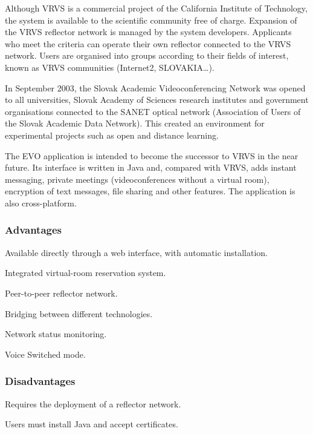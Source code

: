 Although VRVS is a commercial project of the California Institute of Technology, the system is available to the scientific community free of charge. Expansion of the VRVS reflector network is managed by the system developers. Applicants who meet the criteria can operate their own reflector connected to the VRVS network. Users are organised into groups according to their fields of interest, known as VRVS communities (Internet2, SLOVAKIA\ldots).

In September 2003, the Slovak Academic Videoconferencing Network was opened to all universities, Slovak Academy of Sciences research institutes and government organisations connected to the SANET optical network (Association of Users of the Slovak Academic Data Network). This created an environment for experimental projects such as open and distance learning.

The EVO application is intended to become the successor to VRVS in the near future. Its interface is written in Java and, compared with VRVS, adds instant messaging, private meetings (videoconferences without a virtual room), encryption of text messages, file sharing and other features. The application is also cross-platform.

\begin{samepage}
\subsubsection*{Advantages}
\begin{paklist}
\item Available directly through a web interface, with automatic installation.
\item Integrated virtual-room reservation system.
\item Peer-to-peer reflector network.
\item Bridging between different technologies.
\item Network status monitoring.
\item Voice Switched mode.
\end{paklist}
\end{samepage}

\subsubsection*{Disadvantages}
\begin{paklist}
\item Requires the deployment of a reflector network.
\item Users must install Java and accept certificates.
\end{paklist}


